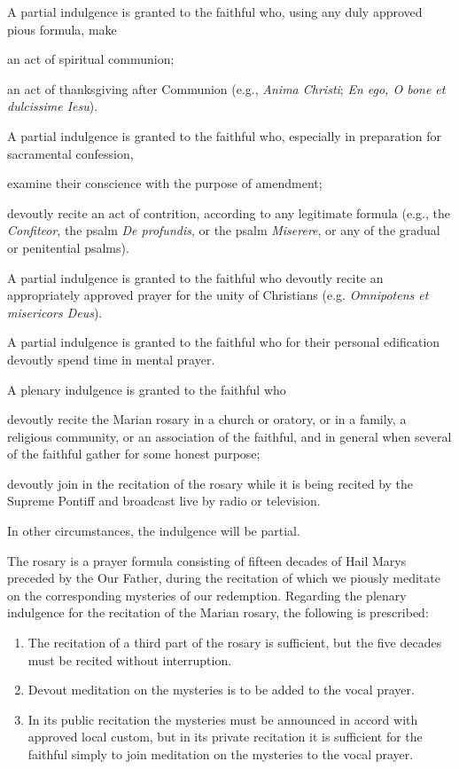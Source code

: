 \documentclass[12pt]{article}
\newcommand{\emphasis}[1]{\emph{#1}}
\newcommand{\emphasis}[1]{\textsl{#1}}
\newcommand{\foreign}[1]{\emphasis{#1}}
\begin{document}
 A partial indulgence is granted to the faithful who, using any duly approved pious formula, make

 an act of spiritual communion;

 an act of thanksgiving after Communion (e.g., \foreign{Anima Christi}; \foreign{En ego, O bone et dulcissime Iesu}).

\hypertarget{grant9}{}
A partial indulgence is granted to the faithful who, especially in preparation for sacramental confession,

 examine their conscience with the purpose of amendment;

 devoutly recite an act of contrition, according to any legitimate formula (e.g., the \foreign{Confiteor}, the psalm \foreign{De profundis}, or the psalm \foreign{Miserere}, or any of the gradual or penitential psalms).

\hypertarget{grant11}{}
 A partial indulgence is granted to the faithful who devoutly recite an appropriately approved prayer for the unity of Christians (e.g. \foreign{Omnipotens et misericors Deus}).

A partial indulgence is granted to the faithful who for their personal edification devoutly spend time in mental prayer.

\hypertarget{grant17}{}
 A plenary indulgence is granted to the faithful who

 devoutly recite the Marian rosary in a church or oratory, or in a family, a religious community, or an association of the faithful, and in general when several of the faithful gather for some honest purpose;

 devoutly join in the recitation of the rosary while it is being recited by the Supreme Pontiff and broadcast live by radio or television.

In other circumstances, the indulgence will be partial.

The rosary is a prayer formula consisting of fifteen decades of Hail Marys preceded by the Our Father, during the recitation of which we piously meditate on the corresponding mysteries of our redemption.
Regarding the plenary indulgence for the recitation of the Marian rosary, the following is prescribed:
\begin{enumerate}
	\item The recitation of a third part of the rosary is sufficient, but the five decades must be recited without interruption.
	\item Devout meditation on the mysteries is to be added to the vocal prayer.
	\item In its public recitation the mysteries must be announced in accord with approved local custom, but in its private recitation it is sufficient for the faithful simply to join meditation on the mysteries to the vocal prayer.
\end{enumerate}
\end{document}

